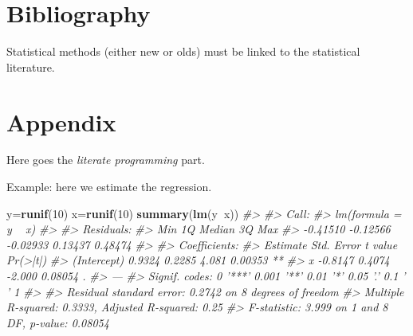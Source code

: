 \documentclass[]{article}
\newenvironment{Shaded}{\begin{snugshade}}{\end{snugshade}}
\newcommand{\CommentTok}[1]{\textcolor[rgb]{0.56,0.35,0.01}{\textit{#1}}}
\newcommand{\DecValTok}[1]{\textcolor[rgb]{0.00,0.00,0.81}{#1}}
\newcommand{\KeywordTok}[1]{\textcolor[rgb]{0.13,0.29,0.53}{\textbf{#1}}}
\newcommand{\NormalTok}[1]{#1}
\newcommand{\OperatorTok}[1]{\textcolor[rgb]{0.81,0.36,0.00}{\textbf{#1}}}
\begin{document}
\hypertarget{bibliography}{%
\section{Bibliography}\label{bibliography}}

Statistical methods (either new or olds) must be linked to the
statistical literature.

\hypertarget{appendix}{%
\section{Appendix}\label{appendix}}

Here goes the \emph{literate programming} part.

Example: here we estimate the regression.

\begin{Shaded}
\begin{Highlighting}[]
\NormalTok{y=}\KeywordTok{runif}\NormalTok{(}\DecValTok{10}\NormalTok{)}
\NormalTok{x=}\KeywordTok{runif}\NormalTok{(}\DecValTok{10}\NormalTok{)}
\KeywordTok{summary}\NormalTok{(}\KeywordTok{lm}\NormalTok{(y}\OperatorTok{~}\NormalTok{x))}
\CommentTok{#> }
\CommentTok{#> Call:}
\CommentTok{#> lm(formula = y ~ x)}
\CommentTok{#> }
\CommentTok{#> Residuals:}
\CommentTok{#>      Min       1Q   Median       3Q      Max }
\CommentTok{#> -0.41510 -0.12566 -0.02933  0.13437  0.48474 }
\CommentTok{#> }
\CommentTok{#> Coefficients:}
\CommentTok{#>             Estimate Std. Error t value Pr(>|t|)   }
\CommentTok{#> (Intercept)   0.9324     0.2285   4.081  0.00353 **}
\CommentTok{#> x            -0.8147     0.4074  -2.000  0.08054 . }
\CommentTok{#> ---}
\CommentTok{#> Signif. codes:  0 '***' 0.001 '**' 0.01 '*' 0.05 '.' 0.1 ' ' 1}
\CommentTok{#> }
\CommentTok{#> Residual standard error: 0.2742 on 8 degrees of freedom}
\CommentTok{#> Multiple R-squared:  0.3333, Adjusted R-squared:   0.25 }
\CommentTok{#> F-statistic: 3.999 on 1 and 8 DF,  p-value: 0.08054}
\end{Highlighting}
\end{Shaded}
\end{document}

